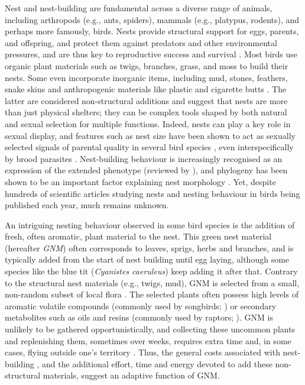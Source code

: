 \documentclass[
  number,
  review,
  onecolumn]{elsarticle}
\begin{document}
Nest and nest-building are fundamental across a diverse range of
animals, including arthropods (e.g., ants, spiders), mammals (e.g.,
platypus, rodents), and perhaps more famously, birds. Nests provide
structural support for eggs, parents, and offspring, and protect them
against predators and other environmental pressures, and are thus key to
reproductive success and survival
\citep{hansell2000, mainwaring2014, deeming2023}. Most birds use organic
plant materials such as twigs, branches, grass, and moss to build their
nests. Some even incorporate inorganic items, including mud, stones,
feathers, snake skins and anthropogenic materials like plastic and
cigarette butts
\citep{sergio2011, suárez-rodríguez2013, jagiello2023, sheard2024}. The
latter are considered non-structural additions and suggest that nests
are more than just physical shelters; they can be complex tools shaped
by both natural and sexual selection for multiple functions. Indeed,
nests can play a key role in sexual display, and features such as nest
size have been shown to act as sexually selected signals of parental
quality in several bird species \citep[e.g.,][]{moreno1994, hoi1996},
even interspecifically by brood parasites \citep{soler1995}.
Nest-building behaviour is increasingly recognised as an expression of
the extended phenotype (reviewed by \citep{moreno2012}), and phylogeny
has been shown to be an important factor explaining nest morphology
\citep{perez2023}. Yet, despite hundreds of scientific articles studying
nests and nesting behaviour in birds being published each year, much
remains unknown.

An intriguing nesting behaviour observed in some bird species is the
addition of fresh, often aromatic, plant material to the nest. This
green nest material (hereafter \emph{GNM}) often corresponds to leaves,
sprigs, herbs and branches, and is typically added from the start of
nest building until egg laying, although some species like the blue tit
(\emph{Cyanistes caeruleus}) keep adding it after that. Contrary to the
structural nest materials (e.g., twigs, mud), GNM is selected from a
small, non-random subset of local flora
\citep{clark1985, petit2002, garrido-bautista2023}. The selected plants
often possess high levels of aromatic volatile compounds (commonly used
by songbirds; \citep{mennerat2009b}) or secondary metabolites such as
oils and resins (commonly used by raptors; \citep{ontiveros2007}). GNM
is unlikely to be gathered opportunistically, and collecting these
uncommon plants and replenishing them, sometimes over weeks, requires
extra time and, in some cases, flying outside one's territory
\citep{mennerat2009}. Thus, the general costs associated with
nest-building \citep{mainwaring2013}, and the additional effort, time
and energy devoted to add these non-structural materials, suggest an
adaptive function of GNM.
\end{document}
